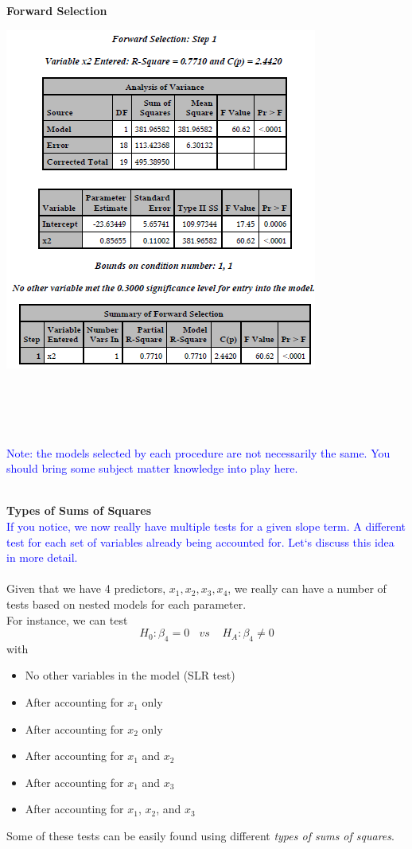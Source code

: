 \textbf{Forward Selection}
\begin{flushleft}
\includegraphics[scale=0.8]{bodyfatforward}
\end{flushleft}
~\\~\\~\\~\\
\textcolor{blue}{Note: the models selected by each procedure are not necessarily the same.  You should bring some subject matter knowledge into play here.}\\~\\

\newpage

\Large\textbf{Types of Sums of Squares}\large\\

\textcolor{blue}{If you notice, we now really have multiple tests for a given slope term.  A different test for each set of variables already being accounted for.  Let`s discuss this idea in more detail.}\\~\\

Given that we have 4 predictors, $x_1,x_2,x_3,x_4$, we really can have a number of tests based on nested models for each parameter.  \\

For instance, we can test 
$$H_0:\beta_4=0~~~~vs~~~~~H_A:\beta_4\neq 0$$ 
with
\begin{itemize}
\item No other variables in the model (SLR test)
\item After accounting for $x_1$ only
\item After accounting for $x_2$ only
\item After accounting for $x_1$ and $x_2$ 
\item After accounting for $x_1$ and $x_3$
\item After accounting for $x_1$, $x_2$, and $x_3$
\end{itemize}
Some of these tests can be easily found using different \textit{types of sums of squares}.\\

